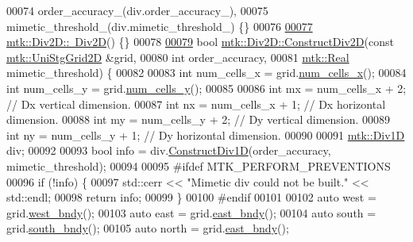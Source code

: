 \begin{DoxyCode}
00074   order\_accuracy\_(div.order\_accuracy\_),
00075   mimetic\_threshold\_(div.mimetic\_threshold\_) \{\}
00076 
\hypertarget{mtk__div__2d_8cc_source_l00077}{}\hyperlink{classmtk_1_1Div2D_a5c10c0d7b974841e923ebe3fda67c468}{00077} \hyperlink{classmtk_1_1Div2D_a5c10c0d7b974841e923ebe3fda67c468}{mtk::Div2D::~Div2D}() \{\}
00078 
\hypertarget{mtk__div__2d_8cc_source_l00079}{}\hyperlink{classmtk_1_1Div2D_a4214055909a6b94fcb9d657cc839055f}{00079} \textcolor{keywordtype}{bool} \hyperlink{classmtk_1_1Div2D_a4214055909a6b94fcb9d657cc839055f}{mtk::Div2D::ConstructDiv2D}(\textcolor{keyword}{const} 
      \hyperlink{classmtk_1_1UniStgGrid2D}{mtk::UniStgGrid2D} &grid,
00080                                 \textcolor{keywordtype}{int} order\_accuracy,
00081                                 \hyperlink{group__c01-roots_gac080bbbf5cbb5502c9f00405f894857d}{mtk::Real} mimetic\_threshold) \{
00082 
00083   \textcolor{keywordtype}{int} num\_cells\_x = grid.\hyperlink{classmtk_1_1UniStgGrid2D_a2d182866a398aba8e4829590e85bf939}{num\_cells\_x}();
00084   \textcolor{keywordtype}{int} num\_cells\_y = grid.\hyperlink{classmtk_1_1UniStgGrid2D_aed05a801cc9a76dba0ff203cea58a61a}{num\_cells\_y}();
00085 
00086   \textcolor{keywordtype}{int} mx = num\_cells\_x + 2;  \textcolor{comment}{// Dx vertical dimension.}
00087   \textcolor{keywordtype}{int} nx = num\_cells\_x + 1;  \textcolor{comment}{// Dx horizontal dimension.}
00088   \textcolor{keywordtype}{int} my = num\_cells\_y + 2;  \textcolor{comment}{// Dy vertical dimension.}
00089   \textcolor{keywordtype}{int} ny = num\_cells\_y + 1;  \textcolor{comment}{// Dy horizontal dimension.}
00090 
00091   \hyperlink{classmtk_1_1Div1D}{mtk::Div1D} div;
00092 
00093   \textcolor{keywordtype}{bool} info = div.\hyperlink{classmtk_1_1Div1D_a52fcd1542f11e606e36bd188e48bfdf7}{ConstructDiv1D}(order\_accuracy, mimetic\_threshold);
00094 
00095 \textcolor{preprocessor}{  #ifdef MTK\_PERFORM\_PREVENTIONS}
00096   \textcolor{keywordflow}{if} (!info) \{
00097     std::cerr << \textcolor{stringliteral}{"Mimetic div could not be built."} << std::endl;
00098     \textcolor{keywordflow}{return} info;
00099   \}
00100 \textcolor{preprocessor}{  #endif}
00101 
00102   \textcolor{keyword}{auto} west = grid.\hyperlink{classmtk_1_1UniStgGrid2D_af2b1712387ded85edaf2b64617d3fc13}{west\_bndy}();
00103   \textcolor{keyword}{auto} east = grid.\hyperlink{classmtk_1_1UniStgGrid2D_a03f689eb29a6369b82ce1207c655d5ff}{east\_bndy}();
00104   \textcolor{keyword}{auto} south = grid.\hyperlink{classmtk_1_1UniStgGrid2D_a1442eaf219f099d0ebf46a170fdebf92}{south\_bndy}();
00105   \textcolor{keyword}{auto} north = grid.\hyperlink{classmtk_1_1UniStgGrid2D_a03f689eb29a6369b82ce1207c655d5ff}{east\_bndy}();

\end{DoxyCode}

